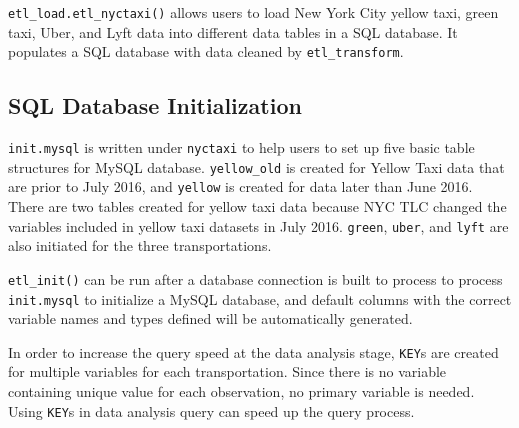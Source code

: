 \documentclass[12pt,twoside]{reedthesis}
\newenvironment{Shaded}{\begin{snugshade}}{\end{snugshade}}
\newcommand{\KeywordTok}[1]{\textcolor[rgb]{0.13,0.29,0.53}{\textbf{#1}}}
\newcommand{\DataTypeTok}[1]{\textcolor[rgb]{0.13,0.29,0.53}{#1}}
\newcommand{\DecValTok}[1]{\textcolor[rgb]{0.00,0.00,0.81}{#1}}
\newcommand{\StringTok}[1]{\textcolor[rgb]{0.31,0.60,0.02}{#1}}
\newcommand{\OperatorTok}[1]{\textcolor[rgb]{0.81,0.36,0.00}{\textbf{#1}}}
\newcommand{\NormalTok}[1]{#1}
\theoremstyle{definition}
\theoremstyle{definition}
\theoremstyle{definition}
\theoremstyle{remark}
\begin{document}
\texttt{etl\_load.etl\_nyctaxi()} allows users to load New York City
yellow taxi, green taxi, Uber, and Lyft data into different data tables
in a SQL database. It populates a SQL database with data cleaned by
\texttt{etl\_transform}.
\begin{Shaded}
\end{Shaded}
\subsection{SQL Database
Initialization}\label{sql-database-initialization}

\texttt{init.mysql} is written under \texttt{nyctaxi} to help users to
set up five basic table structures for MySQL database.
\texttt{yellow\_old} is created for Yellow Taxi data that are prior to
July 2016, and \texttt{yellow} is created for data later than June 2016.
There are two tables created for yellow taxi data because NYC TLC
changed the variables included in yellow taxi datasets in July 2016.
\texttt{green}, \texttt{uber}, and \texttt{lyft} are also initiated for
the three transportations.

\texttt{etl\_init()} can be run after a database connection is built to
process to process \texttt{init.mysql} to initialize a MySQL database,
and default columns with the correct variable names and types defined
will be automatically generated.
\begin{Shaded}
\end{Shaded}
In order to increase the query speed at the data analysis stage,
\texttt{KEY}s are created for multiple variables for each
transportation. Since there is no variable containing unique value for
each observation, no primary variable is needed. Using \texttt{KEY}s in
data analysis query can speed up the query process.
\end{document}

